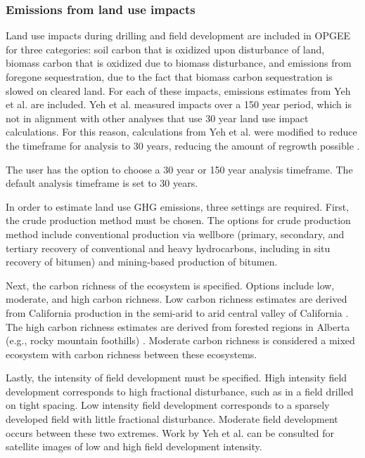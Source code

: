 \documentclass[11pt]{report}
\newcommand{\marg}[1]{{\footnotesize\textit{\textcolor{stanford}{'#1'}}}}
\newcommand{\marginnote}[1]{\marginpar{\marg{#1}}}
\begin{document}
\clearpage

\subsubsection{Emissions from land use impacts}

Land use \marginnote{Drilling \& Development 1.3,2.3} impacts during drilling and field development are included in OPGEE for three categories: soil carbon that is oxidized upon disturbance of land, biomass carbon that is oxidized due to biomass disturbance, and emissions from foregone sequestration, due to the fact that biomass carbon sequestration is slowed on cleared land. For each of these impacts, emissions estimates from Yeh et al. \cite{Yeh2010} are included. Yeh et al. measured impacts over a 150 year \marginnote{Emissions Factors Tables 1.6,1.7} period, which is not in alignment with other analyses that use 30 year land use impact calculations. For this reason, calculations from Yeh et al. were modified to reduce the timeframe for analysis to 30 years, reducing the amount of regrowth possible \cite{Yeh2012}. 

The user has the option to choose a 30 year \marginnote{Drilling \& Development 1.2.13} or 150 year analysis timeframe. The default analysis timeframe is set to 30 years.

In order to estimate land use GHG emissions, three settings are required. \marginnote{Drilling \& Development 1.1.3,1.1.4} First, the crude production method must be chosen. The options for crude production method include conventional production via wellbore (primary, secondary, and tertiary recovery of conventional and heavy hydrocarbons, including in situ recovery of bitumen) and mining-based production of bitumen. 

Next, the carbon richness of the ecosystem is specified. \marginnote{Drilling \& Development 1.1.10} Options include low, moderate, and high carbon richness. Low carbon richness estimates are derived from California production in the semi-arid to arid central valley of California \cite{Yeh2010}. The high carbon richness estimates are derived from forested regions in Alberta (e.g., rocky mountain foothills) \cite{Yeh2010}. Moderate carbon richness is considered a mixed ecosystem with carbon richness between these ecosystems.

Lastly, the intensity of field development must be specified. \marginnote{Drilling \& Development 1.1.11} High intensity field development corresponds to high fractional disturbance, such as in a field drilled on tight spacing. Low intensity field development corresponds to a sparsely developed field with little fractional disturbance. Moderate field development occurs between these two extremes. Work by Yeh et al. \cite{Yeh2010} can be consulted for satellite images of low and high field development intensity.
\end{document}

